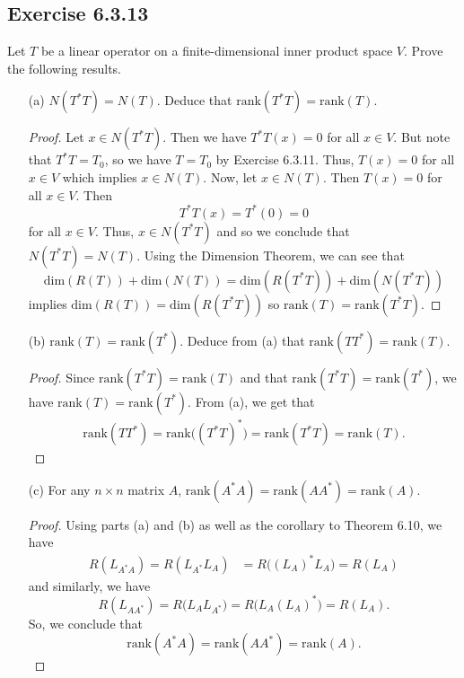 \subsection*{Exercise 6.3.13} Let \( T  \) be a linear operator on a finite-dimensional inner product space \( V  \). Prove the following results.
\begin{enumerate}
    \item[(a)] \( N(T^{*}T) = N(T) \). Deduce that \( \text{rank}(T^{*}T) = \text{rank}(T) \).
        \begin{proof}
        Let \( x \in N(T^{*}T) \). Then we have \( T^{*}T(x) = 0  \) for all \( x \in V  \). But note that \( T^{*}T = {T}_{0} \), so we have \( T = {T}_{0} \) by Exercise 6.3.11. Thus, \( T(x) = 0  \) for all \( x \in V  \) which implies \( x \in N(T)  \). Now, let \( x \in N(T) \). Then \( T(x) = 0  \) for all \( x \in V  \). Then 
        \[  T^{*}T(x) = T^{*}(0) = 0    \]
        for all \( x \in V  \). Thus, \( x \in N(T^{*}T) \) and so we conclude that \( N(T^{*}T) = N(T) \). Using the Dimension Theorem, we can see that 
        \[  \text{dim}(R(T)) + \text{dim}(N(T)) = \text{dim}(R(T^{*}T))  +\text{dim}(N(T^{*}T)) \]
        implies \( \text{dim}(R(T)) = \text{dim}(R(T^{*}T)) \) so \( \text{rank}(T) = \text{rank}(T^{*}T) \).
\end{proof}
    \item[(b)] \( \text{rank}(T) = \text{rank}(T^{*}) \). Deduce from (a) that \( \text{rank}(T T^{*}) = \text{rank}(T)  \).
        \begin{proof}
        Since \( \text{rank}(T^{*}T) = \text{rank}(T) \) and that \( \text{rank}(T^{*}T) = \text{rank}(T^{*}) \), we have \( \text{rank}(T) = \text{rank}(T^{*}) \). From (a), we get that
        \begin{align*}
          \text{rank}(T T^{*}) = \text{rank}\Big(  (T^{*}T)^{*} \Big) = \text{rank}(T^{*}T) = \text{rank}(T).
        \end{align*}
        \end{proof}
    \item[(c)] For any \( n \times n \) matrix \( A  \), \( \text{rank}(A^{*} A) = \text{rank}(A A^{*}) = \text{rank}(A) \).
        \begin{proof}
        Using parts (a) and (b) as well as the corollary to Theorem 6.10, we have
        \begin{align*}
            R({L}_{A^{*}A}) = R({L}_{A^{*}} {L}_{A}) &= R \Big(  {({L}_{A})}^{*} {L}_{A} \Big) = R({L}_{A})
        \end{align*}
        and similarly, we have
        \[ R({L}_{A A^{*}}) = R \Big(  {L}_{A} {L}_{A^{*}} \Big) = R \Big(  {L}_{A} ({L}_{A})^{*} \Big) = R({L}_{A}). \]
        So, we conclude that  
        \[   \text{rank}(A^{*} A) = \text{rank}(A A^{*}) = \text{rank}(A).  \]
        \[   \]
        \end{proof}
\end{enumerate}

